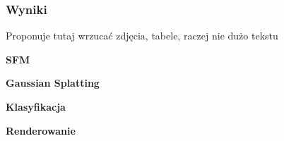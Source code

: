 \subsubsection{Wyniki}

Proponuje tutaj wrzucać zdjęcia, tabele, raczej nie dużo tekstu

\textbf{SFM}

\textbf{Gaussian Splatting}

\textbf{Klasyfikacja}

\textbf{Renderowanie}